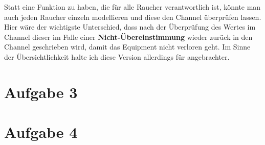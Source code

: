\documentclass[11pt,a4paper,DIV=10,]{scrartcl}
\begin{document}
Statt eine Funktion zu haben, die für alle Raucher verantwortlich ist, könnte man auch jeden Raucher einzeln modellieren und diese den Channel überprüfen lassen. Hier wäre der wichtigste Unterschied, dass nach der Überprüfung des Wertes im Channel dieser im Falle einer \textbf{Nicht-Übereinstimmung} wieder zurück in den Channel geschrieben wird, damit das Equipment nicht verloren geht. Im Sinne der Übersichtlichkeit halte ich diese Version allerdings für angebrachter. 




\section*{Aufgabe 3}
\section*{Aufgabe 4}
%
%
\end{document}
